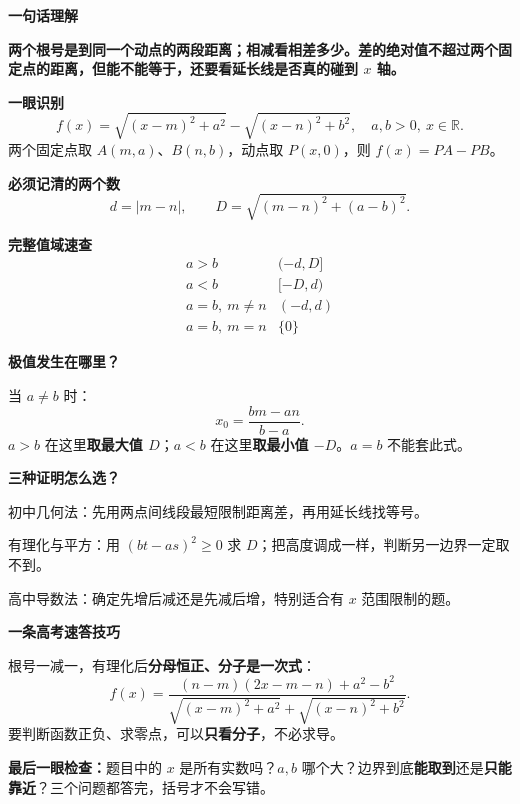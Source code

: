 \clearpage
\begin{summarybox}
\textbf{\textcolor{CSummary}{一句话理解}}

\textbf{两个根号是到同一个动点的两段距离；相减看相差多少。差的绝对值不超过两个固定点的距离，但能不能等于，还要看延长线是否真的碰到 $x$ 轴。}

\medskip
\textbf{\textcolor{CSummary}{一眼识别}}
\[
 f(x)=\sqrt{(x-m)^2+a^2}-\sqrt{(x-n)^2+b^2},
 \quad a,b>0,\ x\in\mathbb R.
\]
两个固定点取 $A(m,a)$、$B(n,b)$，动点取 $P(x,0)$，则 $f(x)=PA-PB$。

\textbf{\textcolor{CSummary}{必须记清的两个数}}
\[
 \boxed{d=|m-n|},\qquad
 \boxed{D=\sqrt{(m-n)^2+(a-b)^2}}.
\]

\textbf{\textcolor{CSummary}{完整值域速查}}
\[
 \boxed{\begin{array}{c|c}
 a>b&(-d,D]\\
 a<b&[-D,d)\\
 a=b,\ m\ne n&(-d,d)\\
 a=b,\ m=n&\{0\}
 \end{array}}
\]

\textbf{\textcolor{CSummary}{极值发生在哪里？}}

当 $a\ne b$ 时：
\[
 \boxed{x_0=\frac{bm-an}{b-a}}.
\]
$a>b$ 在这里\textbf{取最大值 $D$}；$a<b$ 在这里\textbf{取最小值 $-D$}。$a=b$ 不能套此式。

\end{summarybox}
\clearpage
\begin{summarybox}
\textbf{\textcolor{CSummary}{三种证明怎么选？}}
\begin{description}[style=nextline,leftmargin=2.4em,labelsep=.5em,itemsep=.25em]
\item[\textbf{最易懂：}] 初中几何法：先用两点间线段最短限制距离差，再用延长线找等号。
\item[\textbf{最快算：}] 有理化与平方：用 $(bt-as)^2\geq0$ 求 $D$；把高度调成一样，判断另一边界一定取不到。
\item[\textbf{最常规：}] 高中导数法：确定先增后减还是先减后增，特别适合有 $x$ 范围限制的题。
\end{description}

\textbf{\textcolor{CSummary}{一条高考速答技巧}}

根号一减一，有理化后\textbf{分母恒正、分子是一次式}：
\[
 f(x)=\frac{(n-m)(2x-m-n)+a^2-b^2}{
 \sqrt{(x-m)^2+a^2}+\sqrt{(x-n)^2+b^2}}.
\]
要判断函数正负、求零点，可以\textbf{只看分子}，不必求导。

\textbf{最后一眼检查：}题目中的 $x$ 是所有实数吗？$a,b$ 哪个大？边界到底\textbf{能取到}还是\textbf{只能靠近}？三个问题都答完，括号才不会写错。
\end{summarybox}
